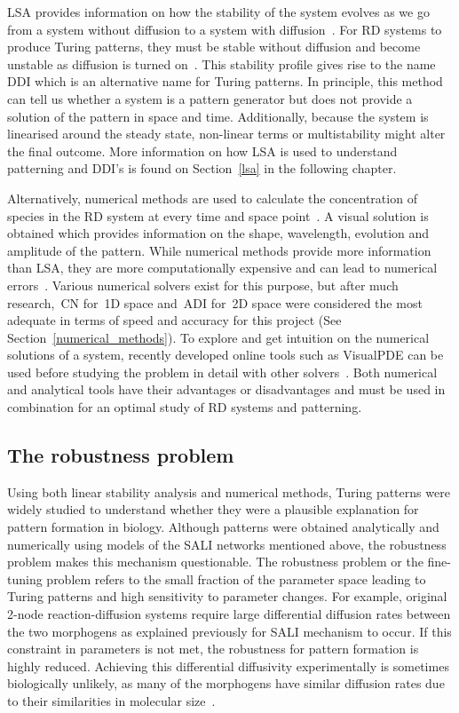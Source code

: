 LSA provides information on how the stability of the system evolves as we go from a system without diffusion to a system with diffusion~\parencite{Glendinning1994}.
For RD systems to produce Turing patterns, they must be stable without diffusion and become unstable as diffusion is turned on~\parencite{J.DMurray2002}.
This stability profile gives rise to the name \acrfull{DDI} which is an alternative name for Turing patterns.
In principle, this method can tell us whether a system is a pattern generator but does not provide a solution of the pattern in space and time. Additionally, because the system is linearised around the steady state, non-linear terms or multistability might alter the final outcome.
More information on how LSA is used to understand patterning and DDI's is found on Section~\ref{lsa} in the following chapter.

Alternatively, numerical methods are used to calculate the concentration of species in the RD system at every time and space point~\parencite{Ramos1983}.
A visual solution is obtained which provides information on the shape, wavelength, evolution and amplitude of the pattern.
While numerical methods provide more information than LSA, they are more computationally expensive and can lead to numerical errors~\parencite{J.DMurray2002}.
Various numerical solvers exist for this purpose, but after much research,~\acrfull{CN} for~\acrshort{1D} space and~\acrfull{ADI} for~\acrshort{2D} space were considered the most adequate in terms of speed and accuracy for this project (See Section~\ref{numerical_methods}).
To explore and get intuition on the numerical solutions of a system, recently developed online tools such as VisualPDE can be used before studying the problem in detail with other solvers~\parencite{Walker2023}.
Both numerical and analytical tools have their advantages or disadvantages and must be used in combination for an optimal study of RD systems and patterning.

\subsection{The robustness problem}

Using both linear stability analysis and numerical methods, Turing patterns were widely studied to understand whether they were a plausible explanation for pattern formation in biology.
Although patterns were obtained analytically and numerically using models of the SALI networks mentioned above, the robustness problem makes this mechanism questionable.
The robustness problem or the fine-tuning problem refers to the small fraction of the parameter space leading to Turing patterns and high sensitivity to parameter changes.
For example, original 2-node reaction-diffusion systems require large differential diffusion rates between the two morphogens as explained previously for SALI mechanism to occur.
If this constraint in parameters is not met, the robustness for pattern formation is highly reduced.
Achieving this differential diffusivity experimentally is sometimes biologically unlikely, as many of the morphogens have similar diffusion rates due to their similarities in molecular size~\parencite{huidobro}.

